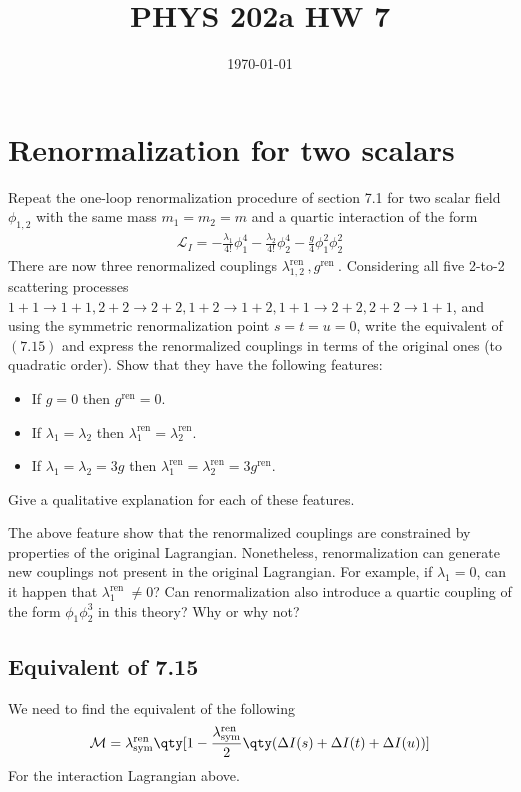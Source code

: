 \documentclass[12pt]{article}
\title{\vspace{-3em}PHYS 202a HW 7}
\date{\today}
\begin{document}
\maketitle

\section{Renormalization for two scalars}
\begin{problem}
  Repeat the one-loop renormalization procedure of section 7.1 for two scalar field $\phi_{1,2}$ with the same mass $m_1=m_2=m$ and a quartic interaction of the form
  \begin{align*}
    \mathcal{L}_I=-\frac{\lambda_1}{4 !} \phi_1^4-\frac{\lambda_2}{4 !} \phi_2^4-\frac{g}{4} \phi_1^2 \phi_2^2
  \end{align*}
  There are now three renormalized couplings $\lambda_{1,2}^{\text {ren }}, g^{\text {ren }}$. Considering all five 2-to-2 scattering processes $1+1 \rightarrow 1+1,2+2 \rightarrow 2+2,1+2 \rightarrow 1+2,1+1 \rightarrow 2+2,2+2 \rightarrow 1+1$, and using the symmetric renormalization point $s=t=u=0$, write the equivalent of $(7.15)$ and express the renormalized couplings in terms of the original ones (to quadratic order). Show that they have the following features:
  \begin{itemize}
  \item If $g=0$ then $g^{\text{ren}}=0$.
  \item If $\lambda_1=\lambda_2$ then
    $\lambda_1^{\text{ren}}=\lambda_2^ {\text{ren}}$.
  \item If $\lambda_1=\lambda_2=3 g$ then
    $\lambda_1^{\text{ren}}=\lambda_2^{\text{ren}}=3 g^{\text{ren}}$.
  \end{itemize}
  Give a qualitative explanation for each of these features.

  The above feature show that the renormalized couplings are constrained by properties of the original Lagrangian. Nonetheless, renormalization can generate new couplings not present in the original Lagrangian. For example, if $\lambda_1=0$, can it happen that $\lambda_1^{\text {ren }} \neq 0$? Can renormalization also introduce a quartic coupling of the form $\phi_1 \phi_2^3$ in this theory? Why or why not?
\end{problem}

\subsection{Equivalent of 7.15}
We need to find the equivalent of the following 
\begin{align*}
  \mathcal{M}=\lambda^{\text{ren}}_{\text{sym}}
  \qty[1-\frac{\lambda^{\text{ren}}_{\text{sym}}}
  2\qty(\Delta I(s)+\Delta I(t)+\Delta I(u))]
\end{align*}
For the interaction Lagrangian above.
\end{document}
